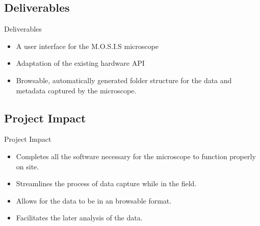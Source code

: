 \documentclass[14pt, aspectratio=169]{beamer}
\begin{document}
\subsection{Deliverables}
\begin{frame}{Deliverables}
	\begin{itemize}
		\item A user interface for the M.O.S.I.S microscope
		\item Adaptation of the existing hardware API
		\item Browsable, automatically generated folder structure for the data and metadata captured by the microscope.
	\end{itemize}
\end{frame}
\subsection{Project Impact}
\begin{frame}{Project Impact}
	\begin{itemize}
		\item Completes all the software necessary for the microscope to function properly on site.
		\item Streamlines the process of data capture while in the field.
		\item Allows for the data to be in an browsable format.
		\item Facilitates the later analysis of the data.
	\end{itemize}
\end{frame}
\end{document}

